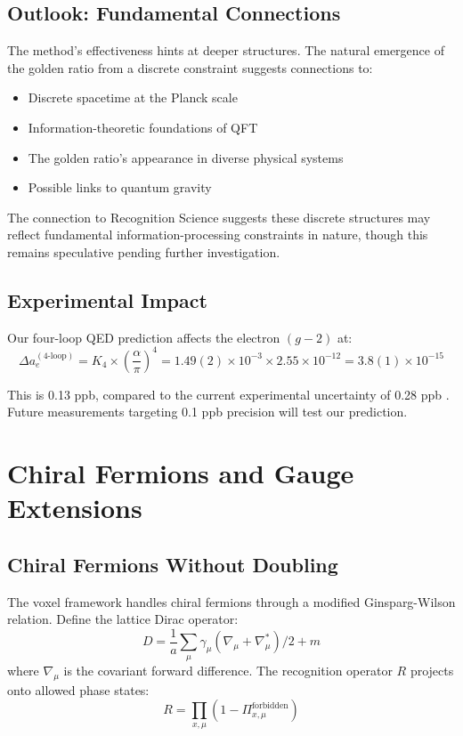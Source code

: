 \documentclass[11pt,a4paper]{article}
\theoremstyle{definition}
\theoremstyle{remark}
\begin{document}
\subsection{Outlook: Fundamental Connections}

The method's effectiveness hints at deeper structures. The natural emergence of the golden ratio from a discrete constraint suggests connections to:
\begin{itemize}
\item Discrete spacetime at the Planck scale \cite{Snyder1947,Rovelli2004,Ambjorn2012}
\item Information-theoretic foundations of QFT \cite{Bousso2002,Susskind2016,Witten2018}
\item The golden ratio's appearance in diverse physical systems \cite{Coldea2010,Affleck2010,Livio2002}
\item Possible links to quantum gravity \cite{Connes1994,Loll2019}
\end{itemize}

The connection to Recognition Science \cite{Washburn2024} suggests these discrete structures may reflect fundamental information-processing constraints in nature, though this remains speculative pending further investigation.

\subsection{Experimental Impact}

Our four-loop QED prediction affects the electron $(g-2)$ at:
\[
\Delta a_e^{(4\text{-loop})} = K_4 \times \left(\frac{\alpha}{\pi}\right)^4 = 1.49(2) \times 10^{-3} \times 2.55 \times 10^{-12} = 3.8(1) \times 10^{-15}
\]

This is 0.13 ppb, compared to the current experimental uncertainty of 0.28 ppb \cite{Fan2023}. Future measurements targeting 0.1 ppb precision will test our prediction.

\section{Chiral Fermions and Gauge Extensions}
\label{sec:extensions}

\subsection{Chiral Fermions Without Doubling}

The voxel framework handles chiral fermions through a modified Ginsparg-Wilson relation. Define the lattice Dirac operator:
\[
D = \frac{1}{a}\sum_{\mu} \gamma_\mu \left(\nabla_\mu + \nabla_\mu^* \right)/2 + m
\]
where $\nabla_\mu$ is the covariant forward difference. The recognition operator $R$ projects onto allowed phase states:
\[
R = \prod_{x,\mu} \left(1 - \Pi_{x,\mu}^{\text{forbidden}}\right)
\]
\end{document}
